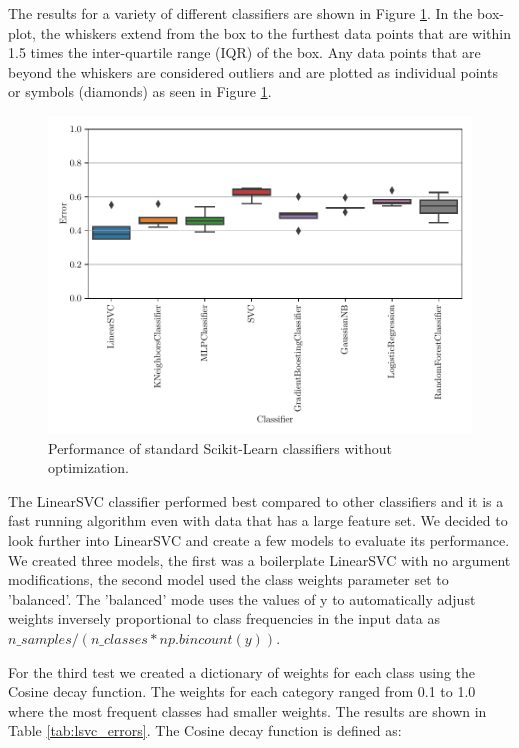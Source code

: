 The results for a variety of different classifiers are shown in Figure \ref{fig:explore_classifiers}. In the box-plot, the whiskers extend from the box to the furthest data points that are within 1.5 times the inter-quartile range (IQR) of the box. Any data points that are beyond the whiskers are considered outliers and are plotted as individual points or symbols (diamonds) as seen in Figure \ref{fig:explore_classifiers}.

\begin{figure}[ht]
  \centering
  \includegraphics[width=\textwidth]{../img/plot_explore_classifiers.pdf}
  \caption{Performance of standard Scikit-Learn classifiers without optimization.}
  \label{fig:explore_classifiers}
\end{figure}

The LinearSVC classifier performed best compared to other classifiers and it is a fast running algorithm even with data that has a large feature set. We decided to look further into LinearSVC and create a few models to evaluate its performance. We created three models, the first was a boilerplate LinearSVC with no argument modifications, the second model used the class weights parameter set to 'balanced'. The 'balanced' mode uses the values of y to automatically adjust weights inversely proportional to class frequencies in the input data as $n\_samples / (n\_classes * np.bincount(y))$. 

For the third test we created a dictionary of weights for each class using the Cosine decay function. The weights for each category ranged from 0.1 to 1.0 where the most frequent classes had smaller weights. The results are shown in Table \ref{tab:lsvc_errors}. The Cosine decay function is defined as:

